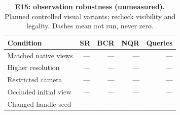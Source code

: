 \begin{table}[!ht]
\centering\small
\caption{\textbf{E15: observation robustness (unmeasured).} Planned controlled visual variants; recheck visibility and legality. Dashes mean not run, never zero.}
\begin{tabularx}{\textwidth}{@{}Xrrrr@{}}\toprule
Condition & SR & BCR & NQR & Queries\\\midrule
Matched native views & --- & --- & --- & ---\\
Higher resolution & --- & --- & --- & ---\\
Restricted camera & --- & --- & --- & ---\\
Occluded initial view & --- & --- & --- & ---\\
Changed handle seed & --- & --- & --- & ---\\
\bottomrule
\end{tabularx}
\end{table}

